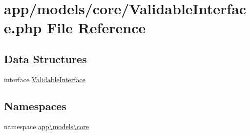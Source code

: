 \hypertarget{_validable_interface_8php}{\section{app/models/core/\-Validable\-Interface.php File Reference}
\label{_validable_interface_8php}
}
\subsection*{Data Structures}
\begin{DoxyCompactItemize}
\item 
interface \hyperlink{interfaceapp_1_1models_1_1core_1_1_validable_interface}{Validable\-Interface}
\end{DoxyCompactItemize}
\subsection*{Namespaces}
\begin{DoxyCompactItemize}
\item 
namespace \hyperlink{namespaceapp_1_1models_1_1core}{app\textbackslash{}models\textbackslash{}core}
\end{DoxyCompactItemize}
